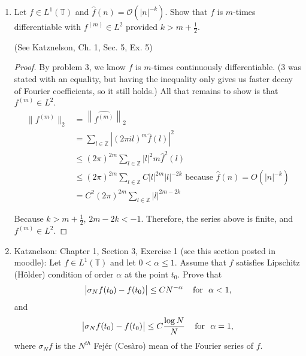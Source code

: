 \documentclass[a4paper]{article}
\newcommand{\Z}{\mathbb{Z}}
\begin{document}
\begin{enumerate}
\begin{proof}
  This is independent of $x$, so $g_n'$ converges uniformly to $g'$. Therefore, $f'(x) = g'(x)$. Also, $\{ g_n' \}$ was a sequence of continuous
  functions, so $f'$ is continuous as well. By applying this result inductively, we get the result for any $m$.

  If $\hat{f}(n) = O(|n|^{-k})$ then
  \[ \hat{f}(n) \leq C |n|^{-k} \]
  for some $C$. Then
  \begin{align*}
    \sum | \hat{f}(n)| |n|^m &\leq C \sum |n|^{m-k} \\
    &\leq \sum |n|^{-1-\varepsilon} \text{ for some } \varepsilon>0 \\
    &< \infty
  \end{align*}
  Therefore, we can apply our result to conclude that $f$ is $m$ times continuously differentiable.

\end{proof}

\item Let $f \in L^1 (\mathbb T)$ and $ \widehat{f} (n ) = \mathcal O (|n|^{-k})$. Show that $f$ is $m$-times  differentiable with $f^{(m)} \in L^2$ provided $k> m +\frac12$.

(See Katznelson, Ch. 1, Sec. 5, Ex. 5)

\begin{proof}

  By problem 3, we know $f$ is $m$-times continuously differentiable. (3 was stated with an equality, but having the inequality only gives us faster
  decay of Fourier coefficients, so it still holds.) All that remains to show is that $f^{(m)} \in L^2$.
  \begin{align*}
    \|f^{(m)}\|_2 &= \left\| \widehat{f^{(m)}} \right\|_2 \\
    &= \sum_{l \in \Z} \left| (2 \pi i l)^m \hat{f}(l) \right|^2 \\
    &\leq (2 \pi)^{2m} \sum_{l \in \Z} |l|^2m \hat{f}^{2}(l) \\
    &\leq (2 \pi)^{2m} \sum_{l \in \Z} C |l|^{2m} |l|^{-2k} \text{ because } \hat{f}(n) = O(|n|^{-k}) \\
    &= C^2 (2 \pi)^{2m} \sum_{l \in \Z} |l|^{2m-2k}
  \end{align*}

  Because $k > m + \frac{1}{2}$, $2m - 2k < -1$. Therefore, the series above is finite, and $f^{(m)} \in L^2$.

\end{proof}

\item Katznelson: Chapter 1, Section 3, Exercise 1 (see this section posted in moodle): Let $f \in L^ 1(\mathbb T)$ and let $0< \alpha \le1$. Assume that $f$ satisfies Lipschitz (H\"older) condition of order $\alpha$ at the point $t_0$. Prove that
$$ \big| \sigma_N f (t_0)   - f(t_0) \big| \le C N^{-\alpha} \,\,\,\,\, \textup{ for } \,\, \alpha<1,$$
and
$$ \big| \sigma_N f (t_0)   - f(t_0) \big| \le C \frac{\log N}{N} \,\,\,\,\, \textup{ for } \,\, \alpha=1,$$
where $\sigma_N f $ is the $N^{th}$ Fej\'er (Ces\`aro) mean of the Fourier series of $f$.


\end{enumerate}
\end{document}
